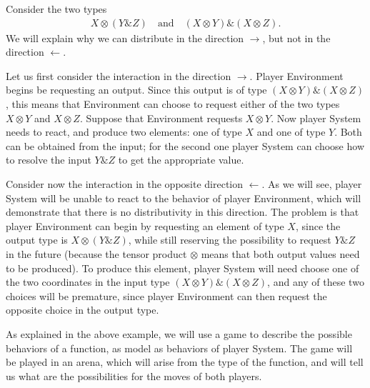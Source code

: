 \begin{example}\label{ex:amp-otimes-distr}
    Consider the two types 
    \begin{align*}
        X \otimes (Y \& Z) 
        \quad \text{and} \quad
        (X \otimes Y) \& (X \otimes Z).
    \end{align*}
    We will explain why we can distribute in the direction $\rightarrow$, but not in the direction $\leftarrow$. 

    Let us first consider the interaction in the  direction $\rightarrow$. Player Environment begins be requesting an output. Since this output is of type $(X \otimes Y) \& (X \otimes Z)$, this means that Environment can choose to request either of the two types  $X \otimes Y$ and $X \otimes Z$. Suppose that Environment requests $X \otimes Y$. Now player System needs to react, and produce two elements: one of type $X$ and one of type $Y$. Both can be obtained from the input; for the second one player System can choose how to resolve the input $Y \& Z$ to get the appropriate value. 

    Consider now the interaction in the opposite direction $\leftarrow$. As we will see, player System will be unable to react to the behavior of player Environment, which will demonstrate that there is no distributivity in this direction. The problem is that player Environment can begin by requesting an element of type $X$, since the output type is $X \otimes (Y \& Z)$, while still reserving the possibility to request $Y \& Z$ in the future (because the tensor product $\otimes$ means that both output values need to be produced). To produce this element, player System will need  choose one of the two coordinates in the input type $(X \otimes Y) \& (X \otimes Z)$, and any of these two  choices will be premature, since player Environment can then request the opposite choice in the output type.  \exampleend
\end{example}

As explained in the above example, we will use a game to describe the possible behaviors of a function, as model as behaviors of player System. The game will be played in an arena, which will arise from the type of the function, and will tell us what are the possibilities for the moves of both players. 


